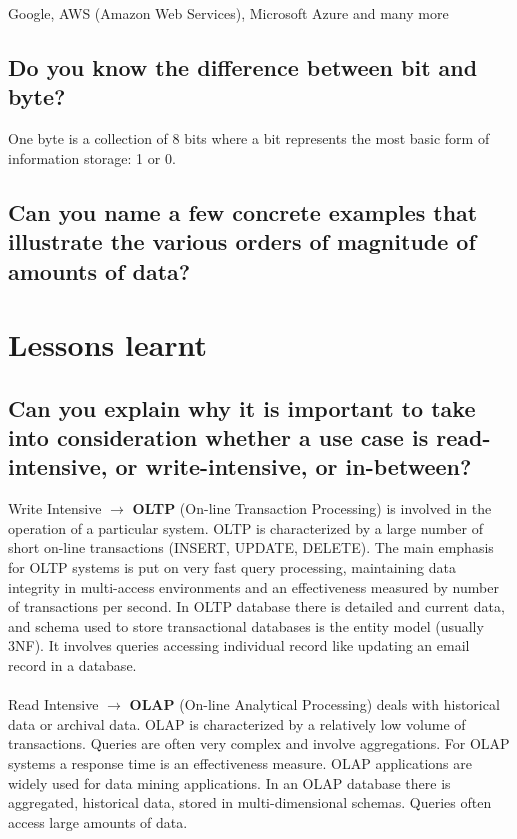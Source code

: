 \documentclass{article}
\begin{document}
Google, AWS (Amazon Web Services), Microsoft Azure and many more

\subsection{Do you know the difference between bit and byte?}

One byte is a collection of 8 bits where a bit represents the most basic form of information storage: 1 or 0.

\subsection{Can you name a few concrete examples that illustrate the various orders of magnitude of amounts of data?}





\section{Lessons learnt}
\subsection{Can you explain why it is important to take into consideration whether a use case is read-intensive, or write-intensive, or in-between?}


Write Intensive $\rightarrow$ \textbf{OLTP} (On-line Transaction Processing) is involved in the operation of a particular system. OLTP is characterized by a large number of short on-line transactions (INSERT, UPDATE, DELETE). The main emphasis for OLTP systems is put on very fast query processing, maintaining data integrity in multi-access environments and an effectiveness measured by number of transactions per second. In OLTP database there is detailed and current data, and schema used to store transactional databases is the entity model (usually 3NF). It involves queries accessing individual record like updating an email record in a database.\\\\

\noindent Read Intensive $\rightarrow$ \textbf{OLAP} (On-line Analytical Processing) deals with historical data or archival data. OLAP is characterized by a relatively low volume of transactions. Queries are often very complex and involve aggregations. For OLAP systems a response time is an effectiveness measure. OLAP applications are widely used for data mining applications. In an OLAP database there is aggregated, historical data, stored in multi-dimensional schemas. Queries often access large amounts of data.
\end{document}
